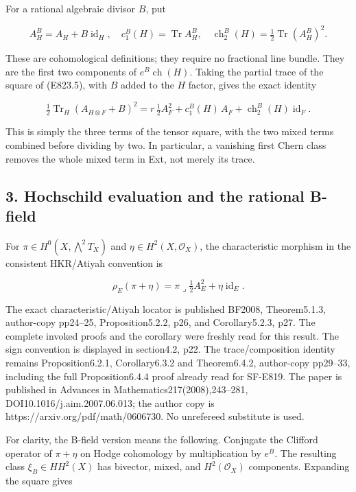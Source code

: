For a rational algebraic divisor \(B\), put

\[
 A_H^B=A_H+B\operatorname{id}_H,
 \quad c_1^B(H)=\operatorname{Tr}A_H^B,
 \quad \operatorname{ch}_2^B(H)=
       \tfrac12\operatorname{Tr}(A_H^B)^2.
 \tag{E823.6}
\]

These are cohomological definitions; they require no fractional line
bundle. They are the first two components of
\(e^B\operatorname{ch}(H)\). Taking the partial trace of the square of
(E823.5), with \(B\) added to the \(H\) factor, gives the exact identity

\[
 \tfrac12\operatorname{Tr}_H(A_{H\otimes F}+B)^2
  =r\,\tfrac12 A_F^2
    +c_1^B(H)\,A_F
    +\operatorname{ch}_2^B(H)\operatorname{id}_F.
 \tag{E823.7}
\]

This is simply the three terms of the tensor square, with the two mixed
terms combined before dividing by two. In particular, a vanishing first
Chern class removes the whole mixed term in Ext, not merely its trace.

\subsection{3. Hochschild evaluation and the rational
B-field}\label{SF-E823-hochschild-evaluation-and-the-rational-b-field}

For \(\pi\in H^0(X,\bigwedge^2T_X)\) and
\(\eta\in H^2(X,\mathcal O_X)\), the characteristic morphism in the
consistent HKR/Atiyah convention is

\[
 \rho_E(\pi+\eta)=
       \pi\mathbin{\lrcorner}\tfrac12 A_E^2
                         +\eta\operatorname{id}_E.
 \tag{E823.8}
\]

The exact characteristic/Atiyah locator is published BF2008,
Theorem5.1.3, author-copy pp24--25, Proposition5.2.2, p26, and
Corollary5.2.3, p27. The complete invoked proofs and the corollary were
freshly read for this result. The sign convention is displayed in
section4.2, p22. The trace/composition identity remains
Proposition6.2.1, Corollary6.3.2 and Theorem6.4.2, author-copy pp29--33,
including the full Proposition6.4.4 proof already read for SF-E819. The
paper is published in Advances in Mathematics217(2008),243--281,
DOI10.1016/j.aim.2007.06.013; the author copy is
https://arxiv.org/pdf/math/0606730. No unrefereed substitute is used.

For clarity, the B-field version means the following. Conjugate the
Clifford operator of \(\pi+\eta\) on Hodge cohomology by multiplication
by \(e^B\). The resulting class \(\xi_B\in HH^2(X)\) has bivector,
mixed, and \(H^2(\mathcal O_X)\) components. Expanding the square gives

